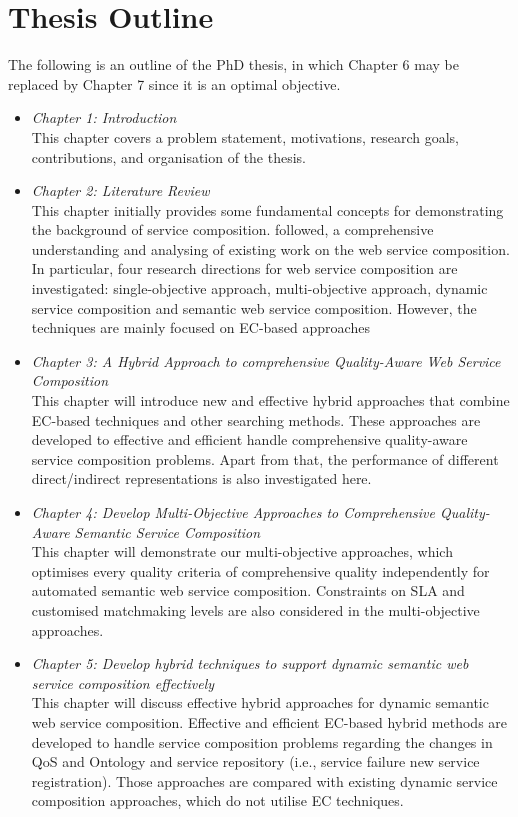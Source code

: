 \section{Thesis Outline}

The following is an outline of the PhD thesis,  in which Chapter 6 may be replaced by Chapter 7 since it is an optimal objective.

\begin{itemize}
 \item \textit{Chapter 1: Introduction}\\
 This chapter covers a problem statement, motivations, research goals, contributions, and organisation of the thesis.
 \item \textit{Chapter 2: Literature Review}\\
This chapter initially provides some fundamental concepts for demonstrating the background of service composition. followed, a comprehensive understanding and analysing of existing work on the web service composition.  In particular, four research directions for web service composition are investigated: single-objective approach, multi-objective approach, dynamic service composition and semantic web service composition.  However, the techniques are mainly focused on EC-based approaches
 \item \textit{Chapter 3: A Hybrid Approach to comprehensive Quality-Aware Web Service Composition}\\
This chapter will introduce new and effective hybrid approaches that combine EC-based techniques and other searching methods. These approaches are developed to effective and efficient handle comprehensive quality-aware service composition problems. Apart from that, the performance of different direct/indirect representations is also investigated here.
 \item \textit{Chapter 4: Develop Multi-Objective Approaches to Comprehensive Quality-Aware Semantic Service Composition}\\
This chapter will demonstrate our multi-objective approaches, which optimises every quality criteria of comprehensive quality independently for automated semantic web service composition. Constraints on SLA and customised matchmaking levels are also considered in the multi-objective approaches.
 \item \textit{Chapter 5: Develop hybrid techniques to support dynamic semantic web service composition effectively}\\
This chapter will discuss effective hybrid approaches for dynamic semantic web service composition. Effective and efficient EC-based hybrid methods are developed to handle service composition problems regarding the changes in QoS and Ontology and service repository (i.e., service failure new service registration). Those approaches are compared with existing dynamic service composition approaches, which do not utilise EC techniques.

\end{itemize}
